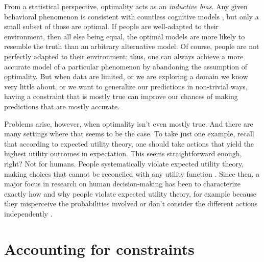 From a statistical perspective, optimality acts as an \emph{inductive bias}. Any given behavioral phenomenon is consistent with countless cognitive models \citep{anderson1978arguments}, but only a small subset of those are optimal. If people are well-adapted to their environment, then all else being equal, the optimal models are more likely to resemble the truth than an arbitrary alternative model. Of course, people are not perfectly adapted to their environment; thus, one can always achieve a more accurate model of a particular phenomenon by abandoning the assumption of optimality. But when data are limited, or we are exploring a domain we know very little about, or we want to generalize our predictions in non-trivial ways, having a constraint that is mostly true can improve our chances of making predictions that are mostly accurate.

Problems arise, however, when optimality isn't even mostly true. And there are many settings where that seems to be the case. To take just one example, recall that according to expected utility theory, one should take actions that yield the highest utility outcomes in expectation. This seems straightforward enough, right? Not for humans. People systematically violate expected utility theory, making choices that cannot be reconciled with any utility function \citep{allais1953comportement,ellsberg1961risk,kahneman1979prospect}. Since then, a major focus in research on human decision-making has been to characterize exactly how and why people violate expected utility theory, for example because they misperceive the probabilities involved \citep{kahneman1979prospect} or don't consider the different actions independently \citep{roe2001multialternative}.

\section{Accounting for constraints}\label{sec:intro-constraints}

